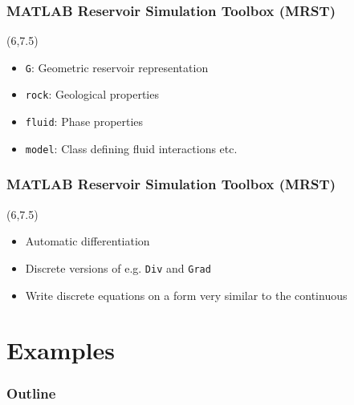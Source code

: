 \documentclass[screen, aspectratio=43]{beamer}
\begin{document}
{
\begin{frame}
  \frametitle{MATLAB Reservoir Simulation Toolbox (MRST)}
  
  \begin{textblock}{9.5}(6,7.5)
    \begin{itemize}
    \item \texttt{G}: Geometric reservoir representation
    \item \texttt{rock}: Geological properties
    \item \texttt{fluid}: Phase properties
    \item \texttt{model}: Class defining fluid interactions etc.
    \end{itemize}
  \end{textblock}

\end{frame}
}

{
\begin{frame}
  
 \frametitle{MATLAB Reservoir Simulation Toolbox (MRST)}

 \begin{textblock}{10}(6,7.5)
    \begin{itemize}
    \item Automatic differentiation
    \item Discrete versions of e.g. \texttt{Div} and \texttt{Grad}
    \item Write discrete equations on a form very similar to the continuous
    \end{itemize}
  \end{textblock}
    
\end{frame}
}


\section{Examples}

\begin{frame}
  \frametitle{Outline}
  \tableofcontents[currentsection]
\end{frame}
\end{document}
